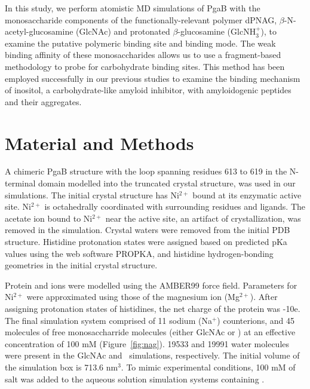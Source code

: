 In this study, we perform atomistic MD simulations of PgaB with the monosaccharide components of the functionally-relevant polymer dPNAG, $\beta$-N-acetyl-glucosamine (GlcNAc) and protonated $\beta$-glucosamine (GlcNH$_{3}^{+}$), to examine the putative polymeric binding site and binding mode.  The weak binding affinity of these monosaccharides allows us to use a fragment-based methodology to probe for carbohydrate binding sites.  This method has been employed successfully in our previous studies to examine the binding mechanism of inositol, a carbohydrate-like amyloid inhibitor, with amyloidogenic peptides and their aggregates.\cite{Li:2012bx}


\section{Material and Methods}
A chimeric PgaB structure with the loop spanning residues 613 to 619 in the N-terminal domain modelled into the truncated crystal structure, was used in our simulations. The initial crystal structure has Ni$^{2+}$ bound at its enzymatic active site. Ni$^{2+}$ is octahedrally coordinated with surrounding residues and ligands.  The acetate ion bound to Ni$^{2+}$ near the active site, an artifact of crystallization, was removed in the simulation. Crystal waters were removed from the initial PDB structure. Histidine protonation states were assigned based on predicted pKa values using the web software PROPKA,\cite{Bas:2008ul,Olsson:2011vi,Sondergaard:2011ug} and histidine hydrogen-bonding geometries in the initial crystal structure.

Protein and ions were modelled using the AMBER99 force field.\cite{Cornell:1995td} Parameters for Ni$^{2+}$ were approximated using those of the magnesium ion (Mg$^{2+}$). After assigning protonation states of histidines, the net charge of the protein was -10e. The final simulation system comprised of 11 sodium (Na$^{+}$) counterions, and 45 molecules of free monosaccharride molecules (either GlcNAc or \glucosamine) at an effective concentration of 100 mM (Figure~\ref{fig:nag}). 19533 and 19991 water molecules were present in the GlcNAc and \glucosamine\ simulations, respectively. The initial volume of the simulation box is 713.6 nm$^{3}$.  To mimic experimental conditions, 100 mM of salt was added to the aqueous solution simulation systems containing \glucosamine.

